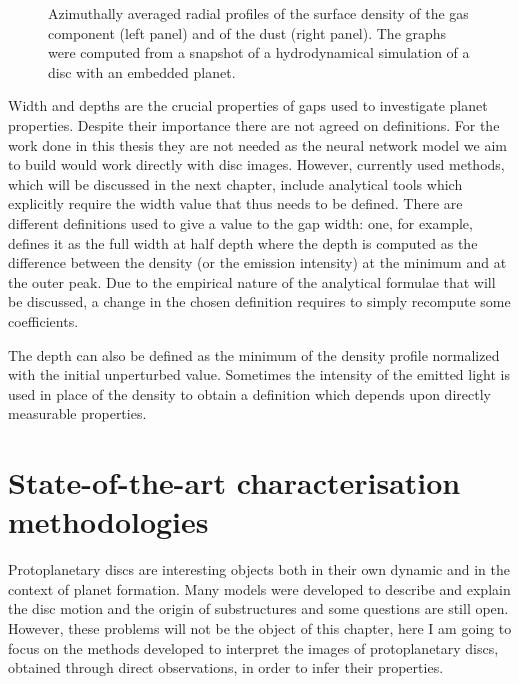 \documentclass[a4paper,10pt]{report}
\begin{document}
\begin{figure}
    \begin{center}
        
    \end{center}
    \caption{Azimuthally averaged radial profiles of the surface density of the gas component (left panel)
    and of the dust (right panel). The graphs were computed from a snapshot of a hydrodynamical
    simulation of a disc with an embedded planet.}
\end{figure}

Width and depths are the crucial properties of gaps used to investigate planet properties. Despite their importance there are not agreed on definitions.
For the work done in this thesis they are not needed as the neural network model we aim to build would work directly with disc images.
However, currently used methods, which will be discussed in the next chapter, include analytical tools which explicitly require the width
value that thus needs to be defined.
There are different definitions used to give a value to the gap width: one, for example, defines it as the full width at half depth \cite{Long_2018} where 
the depth is computed as the difference between the density (or the emission intensity) at the minimum and at the outer peak.
Due to the empirical nature of the analytical formulae that will be discussed, a change in the chosen definition requires to simply recompute
some coefficients.                                        

The depth can also be defined as the minimum of the density profile normalized with the initial unperturbed value. Sometimes the intensity of the emitted light is used in place of the
density to obtain a definition which depends upon directly measurable properties.

\chapter{State-of-the-art characterisation methodologies}

Protoplanetary discs are interesting objects both in their own dynamic and
in the context of planet formation.
Many models were developed to describe and explain the disc motion and the origin of substructures and
some questions are still open. However, these problems will not be the object of this chapter, 
here I am going to focus on the methods developed to interpret the
images of protoplanetary discs, obtained through direct observations, in order to infer their properties.
\end{document}
